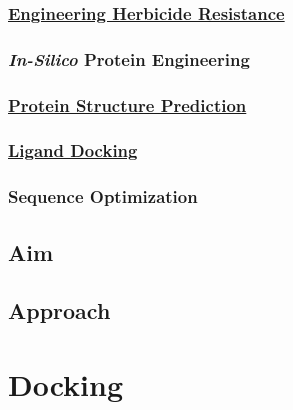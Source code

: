 \hypertarget{engineering-herbicide-resistance}{%
\subsubsection{\texorpdfstring{\href{herbicide-resistance.md}{Engineering
Herbicide
Resistance}}{Engineering Herbicide Resistance}}\label{engineering-herbicide-resistance}}

\hypertarget{in-silico-protein-engineering}{%
\subsubsection{\texorpdfstring{\emph{In-Silico} Protein
Engineering}{In-Silico Protein Engineering}}\label{in-silico-protein-engineering}}

\hypertarget{protein-structure-prediction}{%
\subsubsection{\texorpdfstring{\href{protein-structure-pred.md}{Protein
Structure
Prediction}}{Protein Structure Prediction}}\label{protein-structure-prediction}}

\hypertarget{ligand-docking}{%
\subsubsection{\texorpdfstring{\href{docking.md}{Ligand
Docking}}{Ligand Docking}}\label{ligand-docking}}

\hypertarget{sequence-optimization}{%
\subsubsection{Sequence Optimization}\label{sequence-optimization}}

\hypertarget{aim-1}{%
\subsection{Aim}\label{aim-1}}

\hypertarget{approach}{%
\subsection{Approach}\label{approach}}

\hypertarget{docking}{%
\section{Docking}\label{docking}}

